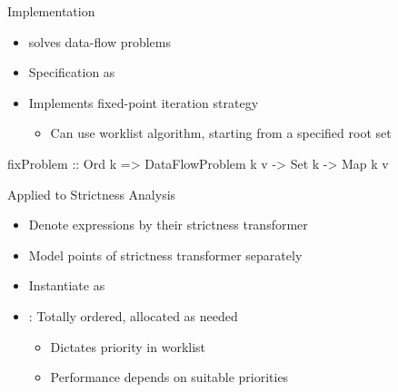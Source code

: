 \documentclass{haskellbeamer}
\begin{document}
\begin{frame}[fragile]{Implementation}
  \begin{itemize}
    \item {} solves data-flow problems 
    \item Specification as 
    \item Implements fixed-point iteration strategy
      \begin{itemize}
        \item Can use worklist algorithm, starting from a specified root set
      \end{itemize}
  \end{itemize}
  \begin{center}
    \begin{minipage}{0.5\textwidth}
      \begin{haskell}
        fixProblem
          :: Ord k
          => DataFlowProblem k v
          -> Set k
          -> Map k v
      \end{haskell}
    \end{minipage}
  \end{center}
\end{frame}

\begin{frame}[fragile]{Applied to Strictness Analysis}
  \begin{itemize}
    \item Denote expressions by their strictness transformer
    \item Model points of strictness transformer separately
    \item Instantiate as 
    \item {}: Totally ordered, allocated as needed
      \begin{itemize}
        \item Dictates priority in worklist
        \item Performance depends on suitable priorities
      \end{itemize}
  \end{itemize}
\end{frame}
\end{document}

